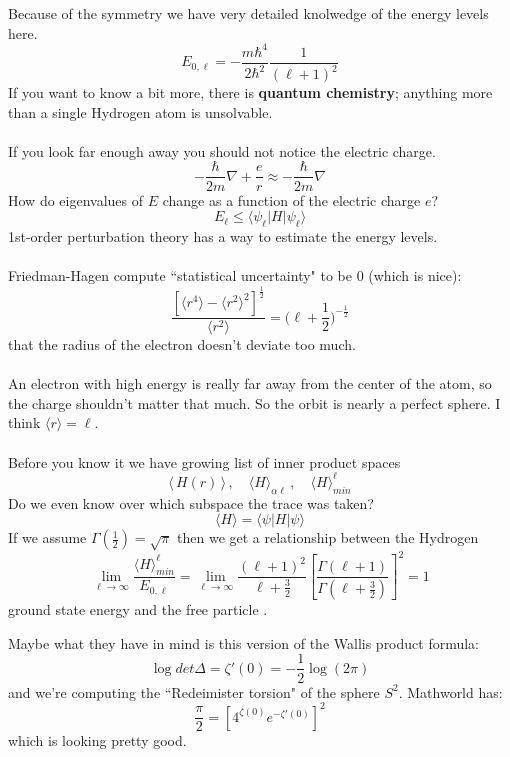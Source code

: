 \documentclass[12pt]{article}
\begin{document}
\noindent Because of the symmetry we have very detailed knolwedge of the energy levels here.
$$ E_{0, \ell } = - \frac{m \hbar^4}{2 \hbar^2} \frac{1}{(\ell + 1)^2} $$
If you want to know a bit more, there is \textbf{quantum chemistry}; anything more than a single Hydrogen atom is unsolvable. \\ \\
If you look far enough away you should not notice the electric charge.
$$  - \frac{\hbar}{2m}\nabla  + \frac{e}{r}  \approx  - \frac{\hbar}{2m}\nabla  $$
How do eigenvalues of $E$ change as a function of the electric charge $e$? 
$$ E_\ell  \leq \langle \psi_\ell | H | \psi_\ell \rangle  $$
1st-order perturbation theory has a way to estimate the energy levels. \\ \\
Friedman-Hagen compute ``statistical uncertainty" to be $0$ (which is nice):
$$ \frac{ [\langle r^4 \rangle - \langle r^2 \rangle^2 ]^{\frac{1}{2}} }{\langle r^2 \rangle} = \Big(\ell + \frac{1}{2}\Big)^{-\frac{1}{2}}$$
that the radius of the electron doesn't deviate too much.  \\ \\
An electron with high energy is really far away from the center of the atom, so the charge shouldn't matter that much.  So the orbit is nearly a perfect sphere.  I think $\langle r \rangle = \ell$. \\\\
Before you know it we have growing list of inner product spaces
$$ \langle \,H(r)\, \rangle\,, \quad \langle H \rangle_{\alpha\ell}\,, \quad \langle H \rangle_{min}^\ell $$
Do we even know over which subspace the trace was taken? 
$$ \langle H \rangle = \langle \psi | H | \psi \rangle $$
If we assume $\Gamma(\frac{1}{2}) = \sqrt{\pi}$ then we get a relationship between the Hydrogen 
$$ \lim_{\ell \to \infty} \frac{\langle H \rangle_{min}^\ell }{ E_{0, \ell}} 
= \lim_{\ell \to \infty}  \frac{(\ell+1)^2}{\ell + \frac{3}{2} }\left[ \frac{ \Gamma (\ell + 1) }{   \Gamma (\ell + \frac{3}{2} ) }\right]^2 = 1$$
ground state energy and the free particle .

\newpage

\noindent Maybe what they have in mind is this version of the Wallis product formula:
$$ \log det \Delta = \zeta'(0) = - \frac{1}{2} \log (2\pi)  $$
and we're computing the ``Redeimister torsion" of the sphere $S^2$. Mathworld has:
$$ \frac{\pi}{2} = \left[ 4^{\zeta(0)} e^{- \zeta'(0)} \right]^2 $$
which is looking pretty good.

\vfill
\end{document}

